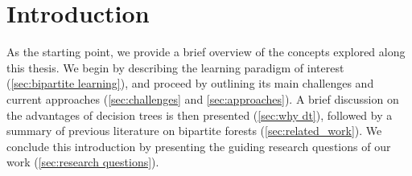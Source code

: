 
\chapter[Introduction]{Introduction}
\label{sec:introduction}

As the starting point, we provide a brief overview of the concepts explored along this thesis. We begin by describing the learning paradigm of interest (\autoref{sec:bipartite learning}), and proceed by outlining its main challenges and current approaches (\autoref{sec:challenges} and \autoref{sec:approaches}).
A brief discussion on the advantages of decision trees is then presented (\autoref{sec:why dt}), followed by a summary of previous literature on bipartite forests (\autoref{sec:related_work}).
We conclude this introduction by presenting the guiding research questions of our work (\autoref{sec:research questions}).



